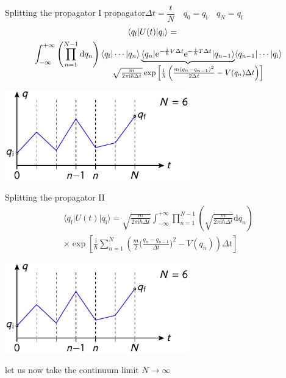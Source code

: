 \documentclass[t,dvipsnames]{beamer}
\begin{document}
\begin{frame}[c]{Splitting the propagator I}
 propagator\qquad $\Delta t=\dfrac{t}{N}\quad q_0=q_\text{i}\quad q_N=q_\text{f}$
 \begin{multline*}
  \hspace{-0.5truecm}\langle q_\text{f}\vert U(t)\vert q_\text{i}\rangle =\\
  \int_{-\infty}^{+\infty}\left(\prod_{n=1}^{N-1}\text{d}q_n\right)
    \langle q_\text{f}\vert \cdots\vert q_n\rangle\underbrace{\langle q_n\vert
	 \text{e}^{-\frac{\text{i}}{\hbar}V\Delta t}
	 \text{e}^{-\frac{\text{i}}{\hbar}T\Delta t}
	 \vert q_{n-1}\rangle}_{\mathclap{\text{\small $%
	 \sqrt{\frac{m}{2\pi\text{i}\hbar\Delta t}}\exp\left[\frac{\text{i}}{\hbar}
	 \left(\frac{m(q_n-q_{n-1})^2}{2\Delta t}-V(q_n)\Delta t\right)\right]$}}}
	 \langle q_{n-1}\vert\cdots\vert q_\text{i}\rangle
 \end{multline*}
 \begin{center}
  \includegraphics[width=0.6\textwidth]{splitting}
 \end{center}
\end{frame}

\begin{frame}[c]{Splitting the propagator II}
 \begin{multline*}
  \langle q_\text{f}\vert U(t)\vert q_\text{i}\rangle
  = \sqrt{\frac{m}{2\pi\text{i}\hbar\Delta t}}\int_{-\infty}^{+\infty}
    \prod_{n=1}^{N-1}\left(\sqrt{\frac{m}{2\pi\text{i}\hbar\Delta t}}\text{d}q_n\right)\\
    \times\exp\left[\frac{\text{i}}{\hbar}\sum_{n=1}^N\left(
	 \frac{m}{2}\bigg(\frac{q_n-q_{n-1}}{\Delta t}\bigg)^2
	 -V(q_n)\right)\Delta t\right]
 \end{multline*}
 \begin{center}
  \includegraphics[width=0.6\textwidth]{splitting}
 \end{center}

 \vspace{0.5truecm}
 \begin{center}
  let us now take the continuum limit $N\to\infty$
 \end{center}
\end{frame}
\end{document}

